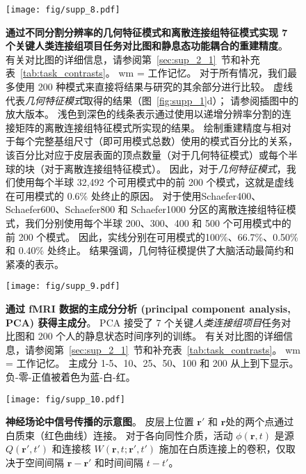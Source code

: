 \documentclass[lang=cn,a4paper,newtx,citestyle=gb7714-2015, bibstyle=gb7714-2015]{elegantpaper}
\begin{document}
\begin{figure}[!htb] 
	\centering
	\texttt{[image: fig/supp\_8.pdf]}
	\caption{
	\textbf{通过不同分割分辨率的几何特征模式和离散连接组特征模式实现 7 个关键人类连接组项目任务对比图和静息态功能耦合的重建精度}。
	有关对比图的详细信息，请参阅第~\ref{sec:sup_2_1}~节和补充表~\ref{tab:task_contrasts}。
	wm = 工作记忆。
	对于所有情况，我们最多使用 200 种模式来直接将结果与研究的其余部分进行比较。
	虚线代表\textit{几何特征模式}取得的结果（图~\ref{fig:supp_1}d）；
	请参阅插图中的放大版本。
	浅色到深色的线条表示通过使用以递增分辨率分割的连接矩阵的离散连接组特征模式所实现的结果。
	绘制重建精度与相对于每个完整基组尺寸（即可用模式总数）使用的模式百分比的关系，该百分比对应于皮层表面的顶点数量（对于几何特征模式）或每个半球的块（对于离散连接组特征模式）。
	因此，对于\textit{几何特征模式}，我们使用每个半球 32,492 个可用模式中的前 200 个模式，这就是虚线在可用模式的 0.6\% 处终止的原因。
	对于使用Schaefer400、Schaefer600、Schaefer800 和 Schaefer1000 分区的离散连接组特征模式，我们分别使用每个半球 200、300、400 和 500 个可用模式中的前 200 个模式。
	因此，实线分别在可用模式的100\%、66.7\%、0.50\% 和 0.40\% 处终止。
	结果强调，几何特征模提供了大脑活动最简约和紧凑的表示。
	} \label{fig:supp_8}
\end{figure}



\begin{figure}[!htb] 
	\centering
	\texttt{[image: fig/supp\_9.pdf]}
	\caption{
		\textbf{通过 fMRI 数据的主成分分析 (principal component analysis, PCA) 获得主成分}。
		PCA 接受了 7 个关键\textit{人类连接组项目}任务对比图和 200 个人的静息状态时间序列的训练。
		有关对比图的详细信息，请参阅第~\ref{sec:sup_2_1}~节和补充表~\ref{tab:task_contrasts}。
		wm = 工作记忆。
		主成分 1-5、10、25、50、100 和 200 从上到下显示。
		负-零-正值被着色为蓝-白-红。
	} \label{fig:supp_9}
\end{figure}


\begin{figure}[!htb] 
	\centering
	\texttt{[image: fig/supp\_10.pdf]}
	\caption{\textbf{神经场论中信号传播的示意图}。
	皮层上位置 $ \boldsymbol{r}' $ 和 $ \boldsymbol{r} $处的两个点通过白质束（红色曲线）连接。
	对于各向同性介质，活动 $ \phi(\boldsymbol{r}, t) $ 是源 $ Q(\boldsymbol{r}',t') $ 和连接核 $ W(\boldsymbol{r},t; \boldsymbol{r}',t') $ 施加在白质连接上的卷积，仅取决于空间间隔 $ \boldsymbol{r}-\boldsymbol{r}' $ 和时间间隔 $ t-t' $。
	} \label{fig:supp_10}
\end{figure}
\end{document}
